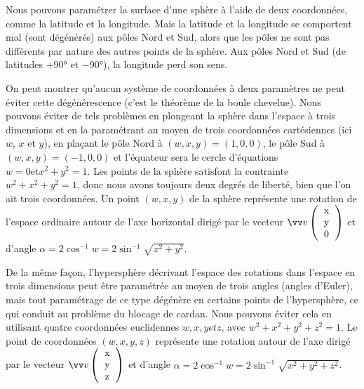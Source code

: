 Nous pouvons paramétrer la surface d'une sphère à l'aide de deux coordonnées, comme la latitude et la longitude. 
Mais la latitude et la longitude se comportent mal (sont dégénérés) aux pôles Nord et Sud, 
alors que les pôles ne sont pas différents par nature des autres points de la sphère. 
Aux pôles Nord et Sud (de latitudes $+$\ang{90} et $-$\ang{90}), la longitude perd son sens.

On peut montrer qu'aucun système de coordonnées à deux paramètres ne peut éviter cette dégénérescence 
(c'est le théorème de la boule chevelue). Nous pouvons éviter de tels problèmes en plongeant la sphère 
dans l'espace à trois dimensions et en la paramétrant au moyen de trois coordonnées 
cartésiennes (ici $w$, $x$ et $y$), en plaçant le pôle Nord à $(w, x, y) = (1, 0, 0)$, 
le pôle Sud à $(w, x, y) = ( -1, 0, 0)$ et l'équateur sera le cercle d'équations 
$w = 0 \text{et} x^2 + y^2 = 1$. Les points de la sphère satisfont la contrainte $w^2 + x^2 + y^2 = 1$, 
donc nous avons toujours deux degrés de liberté, bien que l'on ait trois coordonnées. 
Un point $(w, x, y)$ de la sphère représente une rotation de l'espace ordinaire autour 
de l'axe horizontal dirigé par le vecteur $\vvv{v}{x}{y}{0}$ et d'angle 
$\alpha = 2\cos^{-1} w = 2 \sin^{-1}\sqrt{x^2+y^2}$.

De la même façon, l'hypersphère décrivant l'espace des rotations dans l'espace en trois dimensions 
peut être paramétrée au moyen de trois angles (angles d'Euler), mais tout paramétrage de ce type 
dégénère en certains points de l'hypersphère, ce qui conduit au problème du blocage de cardan. 
Nous pouvons éviter cela en utilisant quatre coordonnées euclidennes $w, x, y et z$, 
avec $w^2 + x^2 + y^2 + z^2 = 1$. Le point de coordonnées $(w, x, y, z)$ représente une rotation 
autour de l'axe dirigé par le vecteur $\vvv{v}{x}{y}{z}$
et d'angle $\alpha = 2\cos^{-1} w = 2 \sin^{-1}\sqrt{x^2+y^2+z^2}$.